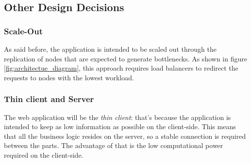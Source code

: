 \bigskip
\subsection{Other Design Decisions}
\subsubsection{Scale-Out}
As said before, the application is intended to be scaled out through the replication of nodes that are expected to generate bottlenecks. As shown in figure \ref{fig:architectue_diagram},
this approach requires load balancers to redirect the requests to nodes with the lowest workload.

\subsubsection{Thin client and Server}
The web application will be the \emph{thin client}: that's because the application is intended to keep as low information as possible on the client-side. This means that all the business
logic resides on the server, so a stable connection is required between the parts. The advantage of that is the low computational power required on the client-side.